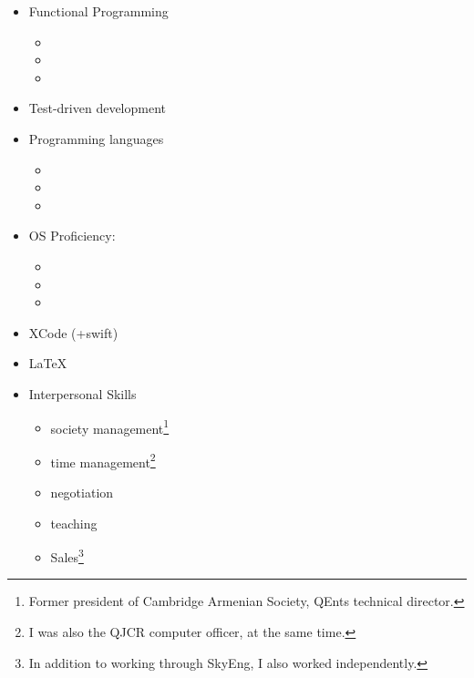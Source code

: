 \documentclass{CurriculumVitae}[10pt, draft, condensed]
\begin{document}
\begin{multicols}{4}
\begin{itemize}[topsep=0pt]
  \item {\footnotesize Functional Programming}
    \begin{itemize}[topsep=0pt, partopsep=0pt]
      \setlength{\itemsep}{-0.3em}
    \item {}
    \item {}
    \item {}
    \end{itemize}
  \item {\footnotesize Test-driven development}
  \item {\footnotesize Programming languages}
    \begin{itemize}[topsep=0pt, partopsep=0pt]
      \setlength{\itemsep}{-0.3em}
    \item {}
    \item {}
    \item {}
    \end{itemize}
  \item {\footnotesize OS Proficiency:}
    \begin{itemize}[topsep=0pt, partopsep=0pt]
      \setlength{\itemsep}{-0.3em}
    \item {}
    \item {}
    \item {}
    \end{itemize}
  \item {\footnotesize XCode (+swift)}
  \item {\footnotesize \LaTeX{}}
  \item {\footnotesize Interpersonal Skills}
    \begin{itemize}[topsep=0pt, partopsep=0pt]
      \setlength{\itemsep}{-0.3em}
    \item society management\footnote{Former president of Cambridge
        Armenian Society, QEnts technical director.}
    \item time management\footnote{I was also the QJCR computer
        officer, at the same time. }
    \item negotiation
    \item teaching
    \item Sales\footnote{In addition to working through SkyEng, I also
        worked independently. }
    \end{itemize}
  \end{itemize}
  
\end{multicols}
\end{document}
